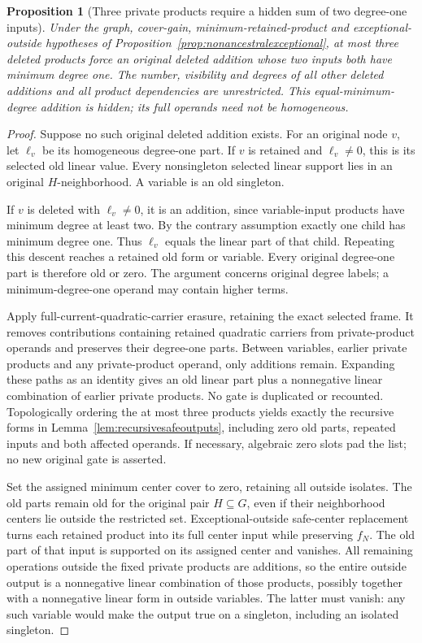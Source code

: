 \documentclass[11pt]{article}
\newtheorem{proposition}[theorem]{Proposition}
\theoremstyle{definition}
\theoremstyle{remark}
\begin{document}
\begin{proposition}[Three private products require a hidden sum of two degree-one inputs]\label{prop:hiddenlinearnecessary}
Under the graph, cover-gain, minimum-retained-product and exceptional-outside hypotheses of Proposition~\ref{prop:nonancestralexceptional}, at most three deleted products force an original deleted addition whose two inputs both have minimum degree one. The number, visibility and degrees of all other deleted additions and all product dependencies are unrestricted. This equal-minimum-degree addition is hidden; its full operands need not be homogeneous.
\end{proposition}
\begin{proof}
Suppose no such original deleted addition exists. For an original node $v$, let $\ell_v$ be its homogeneous degree-one part. If $v$ is retained and $\ell_v\ne0$, this is its selected old linear value. Every nonsingleton selected linear support lies in an original $H$-neighborhood. A variable is an old singleton.

If $v$ is deleted with $\ell_v\ne0$, it is an addition, since variable-input products have minimum degree at least two. By the contrary assumption exactly one child has minimum degree one. Thus $\ell_v$ equals the linear part of that child. Repeating this descent reaches a retained old form or variable. Every original degree-one part is therefore old or zero. The argument concerns original degree labels; a minimum-degree-one operand may contain higher terms.

Apply full-current-quadratic-carrier erasure, retaining the exact selected frame. It removes contributions containing retained quadratic carriers from private-product operands and preserves their degree-one parts. Between variables, earlier private products and any private-product operand, only additions remain. Expanding these paths as an identity gives an old linear part plus a nonnegative linear combination of earlier private products. No gate is duplicated or recounted. Topologically ordering the at most three products yields exactly the recursive forms in Lemma~\ref{lem:recursivesafeoutputs}, including zero old parts, repeated inputs and both affected operands. If necessary, algebraic zero slots pad the list; no new original gate is asserted.

Set the assigned minimum center cover to zero, retaining all outside isolates. The old parts remain old for the original pair $H\subseteq G$, even if their neighborhood centers lie outside the restricted set. Exceptional-outside safe-center replacement turns each retained product into its full center input while preserving $f_N$. The old part of that input is supported on its assigned center and vanishes. All remaining operations outside the fixed private products are additions, so the entire outside output is a nonnegative linear combination of those products, possibly together with a nonnegative linear form in outside variables. The latter must vanish: any such variable would make the output true on a singleton, including an isolated singleton.


\end{proof}
\end{document}
